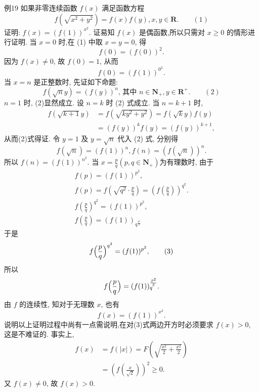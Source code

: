 例19 如果非零连续函数 $f(x)$ 满足函数方程
$$
f\left(\sqrt{x^2+y^2}\right)=f(x) f(y), x, y \in \mathbf{R} .  \quad\quad (1)
$$
证明: $f(x)=(f(1))^{x^2}$.
证易知 $f(x)$ 是偶函数,所以只需对 $x \geqslant 0$ 的情形进行证明.
当 $x=0$ 时,在 (1) 中取 $x=y=0$, 得
$$
f(0)=(f(0))^2 .
$$
因为 $f(x) \neq 0$, 故 $f(0)=1$, 从而
$$
f(0)=(f(1))^{0^2} .
$$
当 $x=n$ 是正整数时, 先证如下命题:
$$
f(\sqrt{n} y)=(f(y))^n \text {, 其中 } n \in \mathbf{N}_{+}, y \in \mathbf{R}^{+}  .  \quad\quad (2)
$$
$n=1$ 时, (2)显然成立.
设 $n=k$ 时 (2) 式成立.
当 $n=k+1$ 时,
$$
\begin{aligned}
f(\sqrt{k+1} y) & =f\left(\sqrt{k y^2+y^2}\right)=f(\sqrt{k} y) f(y) \\
& =(f(y))^k f(y)=(f(y))^{k+1},
\end{aligned}
$$
从而(2)式得证.
令 $y=1$ 及 $y=\sqrt{n}$ 代入 (2) 式, 分别得
$$
f(\sqrt{n})=(f(1))^n, f(n)=(f(\sqrt{n}))^n .
$$
所以 $f(n)=(f(1))^{n^2}$.
当 $x=\frac{p}{q}\left(p, q \in \mathbf{N}_{+}\right)$为有理数时, 由于
$$
\begin{gathered}
f(p)=(f(1))^{p^2}, \\
f(p)=f\left(\sqrt{q^2} \cdot \frac{p}{q}\right)=\left(f\left(\frac{p}{q}\right)\right)^{q^2} . \\
f\left(\frac{p}{q}\right)^{q^2}=(f(1))^{p^2}, \\
f\left(\frac{p}{q}\right)=(f(1))_{q^{\frac{p^2}{2}}}
\end{gathered}
$$
于是
$$
f{\Bigl(\frac{p}{q}\Bigr)}^{q^{2}}=(f(1))^{p^{2}},  \quad\quad (3)
$$
所以
$$
f{\Bigl(\frac{p}{q}\Bigr)}=(f(1))_{q}^{\frac{\beta^{2}}{2}}. 
$$
由 $f$ 的连续性, 知对于无理数 $x$, 也有
$$
f(x)=(f(1))^{x^2} .
$$
说明以上证明过程中尚有一点需说明,在对(3)式两边开方时必须要求 $f(x)>0$, 这是不难证的.
事实上,
$$
\begin{aligned}
f(x) & =f(|x|)=F\left(\sqrt{\frac{x^2}{2}+\frac{x^2}{2}}\right) \\
& =\left(f\left(\frac{x}{\sqrt{2}}\right)\right)^2 \geqslant 0 .
\end{aligned}
$$
又 $f(x) \neq 0$, 故 $f(x)>0$.



